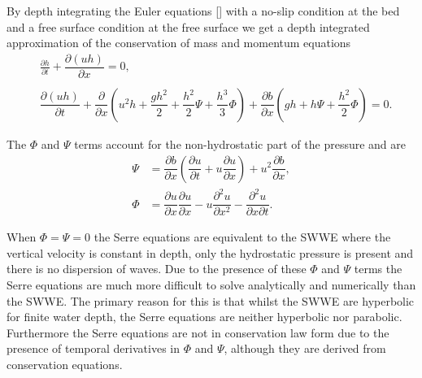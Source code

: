 By depth integrating the Euler equations [] with a no-slip condition at the bed and a free surface condition at the free surface we get a depth integrated approximation of the conservation of mass and momentum equations
\begin{subequations}
	\begin{align}
	&\frac{\partial h}{\partial t} + \dfrac{\partial (uh)}{\partial x} = 0,  \label{eqn:FullSerreNonConMass} \\ \nonumber \\
	&\dfrac{\partial (uh)}{\partial t} + \dfrac{\partial}{\partial x} \left ( u^2h + \dfrac{gh^2}{2} + \dfrac{h^2}{2}{\Psi} + \dfrac{h^3}{3}{ \Phi }  \right )  +  \dfrac{\partial b}{\partial x} \left (gh +   h \Psi + \dfrac{h^2}{2}{ \Phi }  \right ) = 0.	\label{eqn:FullSerreNonConMome}
	\end{align}
	\label{eqn:FullSerreNonCon}
\end{subequations}
\begin{defn}
	\label{eqn:FullSerreNonConVarDef}
	The $\Phi$ and $\Psi$ terms account for the non-hydrostatic part of the pressure and are
	\begin{subequations}
	\begin{align}
	{ \Psi }  &= \dfrac{\partial b}{\partial x}\left(\dfrac{\partial u}{\partial t} + u\dfrac{\partial u}{\partial x} \right)  + u^2\dfrac{\partial b}{\partial x}, \label{eqn:SerreeqnPsi} \\
 { \Phi }  &= \dfrac{\partial u }{\partial x} \dfrac{\partial u}{\partial x} -u \dfrac{\partial^2 u}{\partial x^2}  - \dfrac{\partial^2 u}{\partial x \partial t} . \label{eqn:SerreeqnPhi} 
	\end{align}
	\end{subequations}
\end{defn}
When $\Phi = \Psi = 0$ the Serre equations are equivalent to the SWWE where the vertical velocity is constant in depth, only the hydrostatic pressure is present and there is no dispersion of waves. Due to the presence of these $\Phi$ and $\Psi$ terms the Serre equations are much more difficult to solve analytically and numerically than the SWWE. The primary reason for this is that whilst the SWWE are hyperbolic for finite water depth, the Serre equations are neither hyperbolic nor parabolic. Furthermore the Serre equations are not in conservation law form due to the presence of temporal derivatives in $\Phi$ and $\Psi$, although they are derived from conservation equations. 

